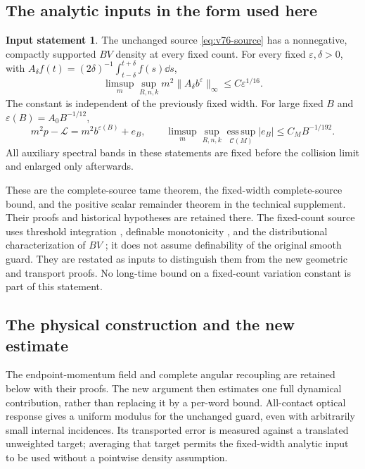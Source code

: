 \documentclass[11pt,reqno]{amsart}
\numberwithin{equation}{section}
\theoremstyle{definition}
\newtheorem{inputstatement}[theorem]{Input statement}
\theoremstyle{remark}\newtheorem{remark}[theorem]{Remark}
\newcommand{\esssup}{\operatorname*{ess\,sup}}
\begin{document}
\subsection{The analytic inputs in the form used here}
\begin{inputstatement}\label{input:v76-analytic}
The unchanged source \eqref{eq:v76-source} has a nonnegative,
compactly supported $BV$ density at every fixed count. For every
fixed $\varepsilon,\delta>0$, with
$A_\delta f(t)=(2\delta)^{-1}\int_{t-\delta}^{t+\delta}f(s)\dd s$,
\begin{equation}\label{eq:v76-average}
 \limsup_m\sup_{R,n,k}m^2\|A_\delta b^\varepsilon\|_\infty
                                      \le C\varepsilon^{1/16}.
\end{equation}
The constant is independent of the previously fixed width. For large
fixed $B$ and $\varepsilon(B)=A_0B^{-1/12}$,
\begin{equation}\label{eq:v76-remainder}
 m^2p-\mathcal L=m^2b^{\varepsilon(B)}+e_B,\qquad
 \limsup_m\sup_{R,n,k}\esssup_{\mathcal C(M)}|e_B|
                                     \le C_MB^{-1/192}.
\end{equation}
All auxiliary spectral bands in these statements are fixed before
the collision limit and enlarged only afterwards.
\end{inputstatement}
These are the complete-source tame theorem, the fixed-width
complete-source bound, and the positive scalar remainder theorem in
the technical supplement. Their proofs and historical hypotheses are
retained there. The fixed-count source uses threshold integration
\cite{CMInt}, definable monotonicity \cite{Coste}, and the
distributional characterization of $BV$ \cite{AFP}; it does not
assume definability of the original smooth guard. They are restated as inputs to distinguish them from
the new geometric and transport proofs. No long-time bound on a
fixed-count variation constant is part of this statement.


\subsection{The physical construction and the new estimate}
The endpoint-momentum field and complete angular recoupling are
retained below with their proofs. The new argument then estimates
one full dynamical contribution, rather than replacing it by a
per-word bound. All-contact optical response gives a uniform modulus
for the unchanged guard, even with arbitrarily small internal
incidences. Its transported error is measured against a translated
unweighted target; averaging that target permits the fixed-width
analytic input to be used without a pointwise density assumption.
\end{document}
